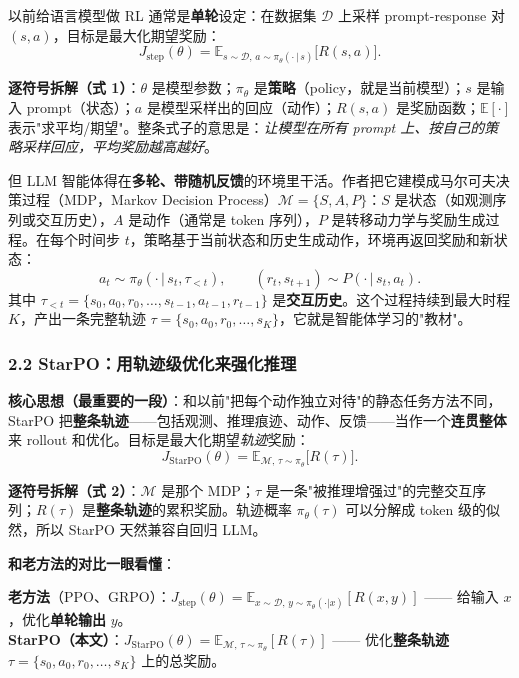 \documentclass[11pt,UTF8,fontset=fandol]{ctexart}
\begin{document}
以前给语言模型做 RL 通常是\textbf{单轮}设定：在数据集 $\mathcal{D}$ 上采样 prompt-response 对 $(s,a)$，目标是最大化期望奖励：
\begin{equation*}
J_{\text{step}}(\theta)=\mathbb{E}_{s\sim\mathcal{D},\,a\sim\pi_\theta(\cdot\,|\,s)}\big[R(s,a)\big].\tag{1}
\end{equation*}

\textbf{逐符号拆解（式 1）}：$\theta$ 是模型参数；$\pi_\theta$ 是\textbf{策略}（policy，就是当前模型）；$s$ 是输入 prompt（状态）；$a$ 是模型采样出的回应（动作）；$R(s,a)$ 是奖励函数；$\mathbb{E}[\cdot]$ 表示"求平均/期望"。整条式子的意思是：\emph{让模型在所有 prompt 上、按自己的策略采样回应，平均奖励越高越好}。

但 LLM 智能体得在\textbf{多轮、带随机反馈}的环境里干活。作者把它建模成马尔可夫决策过程（MDP，Markov Decision Process）$\mathcal{M}=\{S,A,P\}$：$S$ 是状态（如观测序列或交互历史），$A$ 是动作（通常是 token 序列），$P$ 是转移动力学与奖励生成过程。在每个时间步 $t$，策略基于当前状态和历史生成动作，环境再返回奖励和新状态：
\begin{equation*}
a_t\sim\pi_\theta(\cdot\,|\,s_t,\tau_{<t}),\qquad (r_t,s_{t+1})\sim P(\cdot\,|\,s_t,a_t).
\end{equation*}
其中 $\tau_{<t}=\{s_0,a_0,r_0,\dots,s_{t-1},a_{t-1},r_{t-1}\}$ 是\textbf{交互历史}。这个过程持续到最大时程 $K$，产出一条完整轨迹 $\tau=\{s_0,a_0,r_0,\dots,s_K\}$，它就是智能体学习的"教材"。

\subsubsection{2.2 StarPO：用轨迹级优化来强化推理}

\textbf{核心思想（最重要的一段）}：和以前"把每个动作独立对待"的静态任务方法不同，StarPO 把\textbf{整条轨迹}——包括观测、推理痕迹、动作、反馈——当作一个\textbf{连贯整体}来 rollout 和优化。目标是最大化期望\emph{轨迹}奖励：
\begin{equation*}
J_{\text{StarPO}}(\theta)=\mathbb{E}_{\mathcal{M},\,\tau\sim\pi_\theta}\big[R(\tau)\big].\tag{2}
\end{equation*}

\textbf{逐符号拆解（式 2）}：$\mathcal{M}$ 是那个 MDP；$\tau$ 是一条"被推理增强过"的完整交互序列；$R(\tau)$ 是\textbf{整条轨迹}的累积奖励。轨迹概率 $\pi_\theta(\tau)$ 可以分解成 token 级的似然，所以 StarPO 天然兼容自回归 LLM。

\textbf{和老方法的对比一眼看懂}：

\begin{tcolorbox}[colback=gray!5,colframe=gray!50,boxrule=0.5pt,arc=2pt]
\small
\textbf{老方法}（PPO、GRPO）：$J_{\text{step}}(\theta)=\mathbb{E}_{x\sim\mathcal{D},\,y\sim\pi_\theta(\cdot|x)}[R(x,y)]$ —— 给输入 $x$，优化\textbf{单轮输出} $y$。\\[3pt]
\textbf{StarPO（本文）}：$J_{\text{StarPO}}(\theta)=\mathbb{E}_{\mathcal{M},\,\tau\sim\pi_\theta}[R(\tau)]$ —— 优化\textbf{整条轨迹} $\tau=\{s_0,a_0,r_0,\dots,s_K\}$ 上的总奖励。
\end{tcolorbox}
\end{document}
